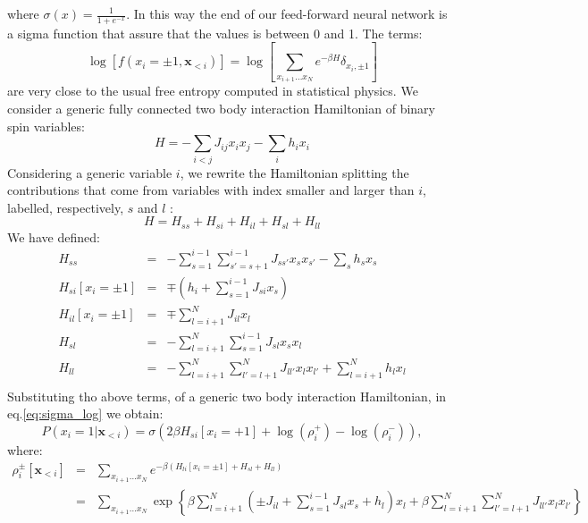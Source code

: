 \documentclass{article}
\begin{document}
where $\sigma(x)=\frac{1}{1+e^{-x}}$. In this way the end of our feed-forward neural network is a sigma function that assure that the values is
between 0 and 1. The terms:
\begin{equation}
\log\left[f\left(x_{i}=\pm 1,\mathbf{x}_{<i}\right)\right] = \log \left[ \sum_{x_{i+1}\dots x_{N}}e^{-\beta H}\delta_{x_i, \pm1} \right] 
\end{equation}
are very close to the usual free entropy computed in statistical physics.
We consider a generic fully connected two body interaction Hamiltonian of binary spin variables:
\begin{equation}
    H = -\sum_{i<j} J_{ij} x_i x_j - \sum_{i} h_i x_i
\end{equation}
Considering a generic variable $i$, we rewrite the Hamiltonian splitting the contributions that come from variables with index smaller and larger than $i$, labelled, respectively, $s$ and $l$ :
\begin{equation}
    H = H_{ss} + H_{si} + H_{il} + H_{sl} + H_{ll}
\end{equation}
We have defined:
\begin{eqnarray}
    H_{ss} & = & - \sum_{s=1}^{i-1}\sum_{s'=s+1}^{i-1} J_{ss'} x_s x_{s'} - \sum_{s} h_s x_s \\
    H_{si}[x_i = \pm 1] & = & \mp \left(h_i + \sum_{s=1}^{i-1} J_{si} x_s\right)\\
    H_{il}[x_i = \pm 1] & = & \mp \sum_{l=i+1}^{N} J_{il} x_l \\
    H_{sl} & = & - \sum_{l=i+1}^{N}\sum_{s=1}^{i-1} J_{sl} x_s x_l\\
    H_{ll} & = & - \sum_{l=i+1}^{N}\sum_{l'=l+1}^{N} J_{ll'} x_l x_{l'} + \sum_{l=i+1}^N h_l x_l\\
\end{eqnarray}
Substituting tho above terms, of a generic two body interaction Hamiltonian, in eq.\ref{eq:sigma_log} we obtain:
\begin{equation}
P\left(x_{i}=1|\mathbf{x}_{<i}\right) = \sigma\left( 
 2 \beta H_{si}[x_i = +1] +\log(\rho_i^+) - \log(\rho_i^-)
\right),
\end{equation}
where:
\begin{eqnarray}
\rho_i^{\pm}[\mathbf{x}_{<i}] &=& \sum_{x_{i+1}\dots x_{N}} e^{-\beta \left(
H_{li}[x_i = \pm 1] + H_{sl} + H_{ll}\right)} \\
& = & \sum_{x_{i+1}\dots x_{N}} \exp\left\{
\beta\sum_{l=i+1}^{N}\left( \pm J_{il} + \sum_{s=1}^{i-1} J_{sl} x_s + h_l \right) x_l + \beta\sum_{l=i+1}^{N}\sum_{l'=l+1}^{N} J_{ll'} x_l x_{l'}
\right\}
\end{eqnarray}
\end{document}
